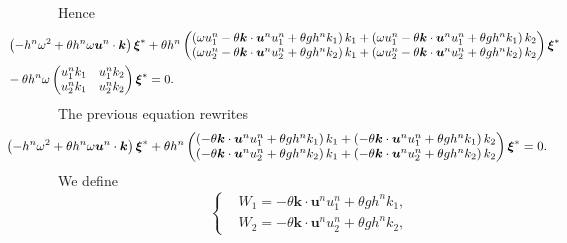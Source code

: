 \documentclass[a4paper, 11pt]{report}
\begin{document}
Hence
\begin{equation*}
\begin{split}
&\hspace*{-1.5cm}\left(-h^n\omega^2+\theta h^n\omega \boldsymbol{u}^n\cdot \boldsymbol{k}\right)\boldsymbol{\xi}^*+\theta h^n \begin{pmatrix}\left(\omega u_1^n-\theta\boldsymbol{k}\cdot \boldsymbol{u}^n u_1^n+\theta g h^nk_1\right)k_1+\left(\omega u_1^n-\theta\boldsymbol{k}\cdot \boldsymbol{u}^n u_1^n+\theta g h^nk_1\right)k_2 \\
\left(\omega u_2^n-\theta\boldsymbol{k}\cdot \boldsymbol{u}^n u_2^n+\theta g h^nk_2\right)k_1+\left(\omega u_2^n-\theta\boldsymbol{k}\cdot \boldsymbol{u}^n u_2^n+\theta g h^nk_2\right)k_2\end{pmatrix}\boldsymbol{\xi}^*\\
&\hspace*{-1.5cm}-\theta h^n \omega \begin{pmatrix}u_1^nk_1&u_1^nk_2\\u_2^nk_1 &u_2^nk_2\end{pmatrix}\boldsymbol{\xi}^*=0.
\end{split}
\end{equation*}
The previous equation rewrites
\begin{equation*}
\begin{split}
&\hspace*{-1.5cm}\left(-h^n\omega^2+\theta h^n\omega \boldsymbol{u}^n\cdot \boldsymbol{k}\right)\boldsymbol{\xi}^*+\theta h^n \begin{pmatrix}\left(-\theta\boldsymbol{k}\cdot \boldsymbol{u}^n u_1^n+\theta g h^nk_1\right)k_1+\left(-\theta\boldsymbol{k}\cdot \boldsymbol{u}^n u_1^n+\theta g h^nk_1\right)k_2 \\
\left(-\theta\boldsymbol{k}\cdot \boldsymbol{u}^n u_2^n+\theta g h^nk_2\right)k_1+\left(-\theta\boldsymbol{k}\cdot \boldsymbol{u}^n u_2^n+\theta g h^nk_2\right)k_2\end{pmatrix}\boldsymbol{\xi}^*=0.
\end{split}
\end{equation*}
We define 
\begin{equation*}
\left\{
\begin{split}
&W_1=-\theta\boldsymbol{k}\cdot \boldsymbol{u}^n u_1^n+\theta g h^nk_1,\\
&W_2=-\theta\boldsymbol{k}\cdot \boldsymbol{u}^n u_2^n+\theta g h^nk_2,
\end{split}
\right.
\end{equation*}
\end{document}
